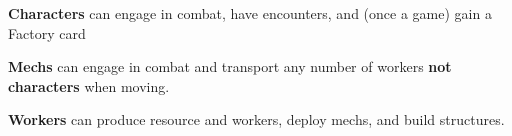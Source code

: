 \documentclass[12pt]{article}
\begin{document}
\begin{multicols*}{2}
\textbf{Characters} can engage in combat, have encounters, and (once a game) gain a Factory card

\textbf{Mechs} can engage in combat and transport any number of workers {\textbf{not characters}} when moving.

\textbf{Workers} can produce resource and workers, deploy mechs, and build structures.

\end{multicols*}
\end{document}
